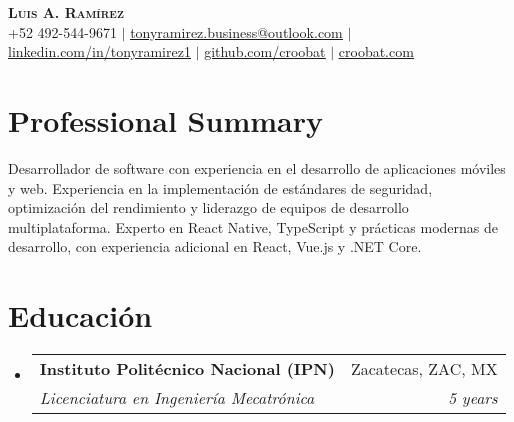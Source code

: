 \documentclass[letterpaper,11pt]{article}
\makeatletter
\newcommand{\resumeSubheading}[4]{
  \vspace{4pt}\item
    \begin{tabular*}{0.97\textwidth}[t]{l@{\extracolsep{\fill}}r}
      \textbf{#1} & #2 \\
      \textit{\small#3} & \textit{\small #4} \\
    \end{tabular*}\vspace{-2pt}
}
\newcommand{\resumeSubHeadingListStart}{\begin{itemize}[leftmargin=0.15in, label={}]}
\newcommand{\resumeSubHeadingListEnd}{\end{itemize}}
\makeatother
\begin{document}
\begin{center}
    \textbf{\Huge \scshape Luis A. Ramírez} \\ \vspace{1pt}
    \small +52 492-544-9671 $|$ \href{tonyramirez.business@outlook.com}{\underline{tonyramirez.business@outlook.com}} $|$
    \href{https://linkedin.com/in/tonyramirez1}{\underline{linkedin.com/in/tonyramirez1}} $|$
    \href{https://github.com/croobat}{\underline{github.com/croobat}} $|$
		\href{https://croobat.com}{\underline{croobat.com}}
\end{center}

\section{Professional Summary}
\begin{itemize}[leftmargin=0.15in, label={}]
\small{
\item{Desarrollador de software con experiencia en el desarrollo de aplicaciones móviles y web. Experiencia en la implementación de estándares de seguridad, optimización del rendimiento y liderazgo de equipos de desarrollo multiplataforma. Experto en React Native, TypeScript y prácticas modernas de desarrollo, con experiencia adicional en React, Vue.js y .NET Core.}
}
\end{itemize}

\section{Educación}
  \resumeSubHeadingListStart
    \resumeSubheading
      {Instituto Politécnico Nacional (IPN)}{Zacatecas, ZAC, MX}
      {Licenciatura en Ingeniería Mecatrónica}{5 years}
  \resumeSubHeadingListEnd

\end{document}
